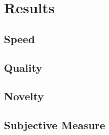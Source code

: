 \chapter{Results}
\label{results}

\section{Speed}
\section{Quality}
\section{Novelty}
\section{Subjective Measure}
